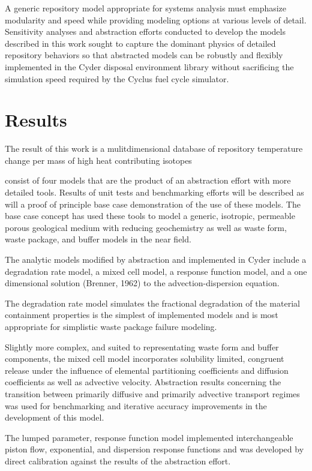 \documentclass[letterpaper]{article}
\begin{document}
A generic repository model appropriate for systems analysis must emphasize 
modularity and speed while providing modeling options at various levels of 
detail. Sensitivity analyses and abstraction efforts conducted to develop the 
models described in this work sought to capture the dominant physics of detailed 
repository behaviors so that abstracted models can be robustly and flexibly 
implemented in the Cyder disposal environment library without sacrificing the 
simulation speed required by the Cyclus fuel cycle simulator.

\section{Results}

The result of this work is a mulitdimensional database of repository temperature 
change per mass of high heat contributing isotopes 

consist of four models that are the product of an 
abstraction effort with more detailed tools. Results of unit tests and 
benchmarking efforts will be described as will a proof of principle base case 
demonstration of the use of these models. The base case concept has used these 
tools to model a generic, isotropic, permeable porous geological medium with 
reducing geochemistry as well as waste form, waste package, and buffer models in 
the near field.

The analytic models modified by abstraction and implemented in Cyder include a 
degradation rate model, a mixed cell model, a response function model, and a 
one dimensional solution (Brenner, 1962) to the advection-dispersion equation.

The degradation rate model simulates the fractional degradation of the material 
containment properties is the simplest of implemented models and is most 
appropriate for simplistic waste package failure modeling. 

Slightly more complex, and suited to representating waste form and buffer 
components, the mixed cell model incorporates solubility limited, congruent 
release under the influence of elemental partitioning coefficients and diffusion 
coefficients as well as advective velocity. Abstraction results concerning the 
transition between primarily diffusive and primarily advective transport regimes 
was used for benchmarking and iterative accuracy improvements in the development 
of this model.

The lumped parameter, response function model implemented interchangeable piston flow, 
exponential, and dispersion response functions and was developed by direct 
calibration against the results of the abstraction effort.  
\end{document}
